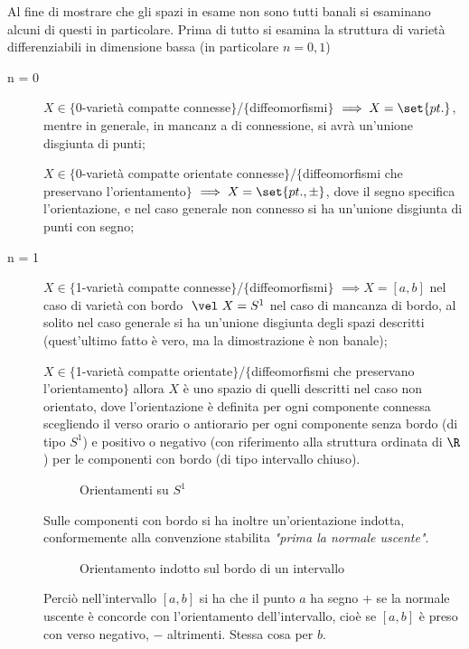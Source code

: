 
Al fine di mostrare che gli spazi in esame non sono tutti banali si esaminano alcuni di questi in particolare.
Prima di tutto si esamina la struttura di varietà differenziabili in dimensione bassa (in particolare $n = 0, 1$)
\begin{description}
\item [n = 0] $X \in \{$0-varietà compatte connesse$\}$/$\{$diffeomorfismi$\}$ $\implies X = \set{pt.}$, mentre in generale, in mancanz	a di connessione, si avrà un'unione disgiunta di punti;

$X \in \{$0-varietà compatte orientate connesse$\}$/$\{$diffeomorfismi che preservano l'orientamento$\}$ $\implies X = \set{pt., \pm}$, dove il segno specifica l'orientazione, e nel caso generale non connesso si ha un'unione disgiunta di punti con segno;
\item [n = 1] $X \in \{$1-varietà compatte connesse$\}$/$\{$diffeomorfismi$\}$ $\implies X = [a,b]$ nel caso di varietà con bordo $~\vel~ X = S^1$ nel caso di mancanza di bordo, al solito nel caso generale si ha un'unione disgiunta degli spazi descritti (quest'ultimo fatto è vero, ma la dimostrazione è non banale);

$X \in \{$1-varietà compatte orientate$\}$/$\{$diffeomorfismi che preservano l'orientamento$\}$ allora $X$ è uno spazio di quelli descritti nel caso non orientato, dove l'orientazione è definita per ogni componente connessa scegliendo il verso orario o antiorario per ogni componente senza bordo (di tipo $S^1$) e positivo o negativo (con riferimento alla struttura ordinata di $\R$) per le componenti con bordo (di tipo intervallo chiuso).\\
\begin{figure}[h]
\centering

\caption{Orientamenti su $S^1$}
\end{figure}
Sulle componenti con bordo si ha inoltre un'orientazione indotta, conformemente alla convenzione stabilita \emph{"prima la normale uscente"}.
\begin{wrapfigure}{i!}{0.5\textwidth}

\caption{Orientamento indotto sul bordo di un intervallo}
\end{wrapfigure}
Perciò nell'intervallo $[a,b]$ si ha che il punto $a$ ha segno $+$ se la normale uscente è concorde con l'orientamento dell'intervallo, cioè se $[a,b]$ è preso con verso negativo, $-$ altrimenti. Stessa cosa per $b$.
\end{description}


